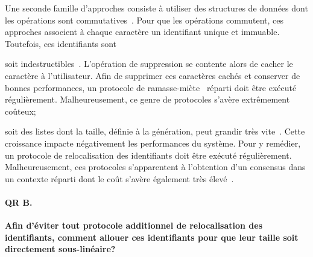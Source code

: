   Une seconde famille d'approches consiste à utiliser des structures de données
  dont les opérations sont commutatives~\cite{shapiro2011conflict}. Pour que les
  opérations commutent, ces approches associent à chaque caractère un
  identifiant unique et immuable. Toutefois, ces identifiants sont
  \begin{inparaenum}[(i)]
  \item soit indestructibles~\cite{oster2006data}. L'opération de suppression se
    contente alors de cacher le caractère à l'utilisateur. Afin de supprimer ces
    caractères cachés et conserver de bonnes performances, un protocole de
    ramasse-miète~\cite{abdullahi1998garbage} réparti doit être exécuté
    régulièrement. Malheureusement, ce genre de protocoles s'avère extrêmement
    coûteux;
  \item soit des listes dont la taille, définie à la génération, peut grandir
    très vite~\cite{weiss2009logoot}. Cette croissance impacte négativement les
    performances du système. Pour y remédier, un protocole de relocalisation des
    identifiants doit être exécuté régulièrement. Malheureusement, ces
    protocoles s'apparentent à l'obtention d'un consensus dans un contexte
    réparti dont le coût s'avère également très
    élevé~\cite{mostefaoui2015signature}.
  \end{inparaenum}

  \paragraph{QR B.} \textbf{Afin d'éviter tout protocole additionnel de
    relocalisation des identifiants, comment allouer ces identifiants pour que
    leur taille soit directement sous-linéaire?}



